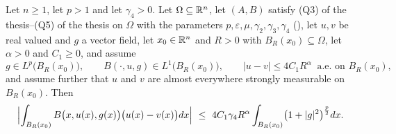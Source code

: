 \begin{lemma}
Let $n\ge1$, let $p>1$ and let $\gamma_4>0$.  Let $\Omega\subseteq\mathbb{R}^n$, let
$(A,B)$ satisfy (Q3) of the thesis--(Q5) of the thesis on $\Omega$ with the parameters
$p,\varepsilon,\mu,\gamma_2,\gamma_3,\gamma_4$
(), let $u,v$ be real valued and $g$ a vector
field, let $x_0\in\mathbb{R}^n$ and $R>0$ with $B_R(x_0)\subseteq\Omega$, let
$\alpha>0$ and $C_1\ge0$, and assume
\[
g\in L^p\bigl(B_R(x_0)\bigr),
\qquad
B(\cdot,u,g)\in L^1\bigl(B_R(x_0)\bigr),
\qquad
|u-v|\le4C_1R^{\alpha}\ \text{ a.e. on }B_R(x_0),
\]
and assume further that $u$ and $v$ are almost everywhere strongly measurable
on $B_R(x_0)$.
Then
\[
\Bigl|\int_{B_R(x_0)}B\bigl(x,u(x),g(x)\bigr)\bigl(u(x)-v(x)\bigr)dx\Bigr|
\ \le\ 4C_1\gamma_4R^{\alpha}
\int_{B_R(x_0)}\bigl(1+|g|^2\bigr)^{\frac p2}dx .
\]
\end{lemma}

